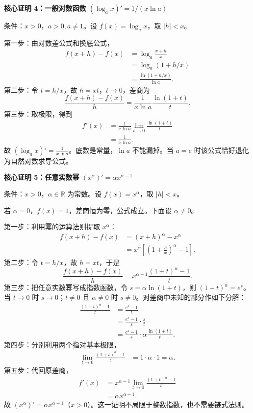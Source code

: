 \begin{proofbox}
\medskip
\begin{minipage}{\linewidth}
\textbf{\textcolor{CProof}{核心证明 4：一般对数函数 $(\log_a x)'=1/(x\ln a)$}}


\end{minipage}

条件：$x>0$，$a>0,a\ne1$。设 $f(x)=\log_a x$，取 $|h|<x$。

第一步：由对数差公式和换底公式，
\[
\begin{aligned}
f(x+h)-f(x)&=\log_a\frac{x+h}{x}\\
&=\log_a(1+h/x)\\
&=\frac{\ln(1+h/x)}{\ln a}.
\end{aligned}
\]
第二步：令 $t=h/x$，故 $h=xt$，$t\to0$，差商为
\[
\frac{f(x+h)-f(x)}h=\frac1{x\ln a}\frac{\ln(1+t)}t.
\]
第三步：取极限，得到
\[
\begin{aligned}
f'(x)&=\frac1{x\ln a}\lim_{t\to0}\frac{\ln(1+t)}t\\
&=\frac1{x\ln a}.
\end{aligned}
\]
故 $\boxed{(\log_a x)'=\frac1{x\ln a}}$。底数是常量，$\ln a$ 不能漏掉。当 $a=e$ 时该公式恰好退化为自然对数求导公式。

\medskip
\begin{minipage}{\linewidth}
\textbf{\textcolor{CProof}{核心证明 5：任意实数幂 $(x^\alpha)'=\alpha x^{\alpha-1}$}}


\end{minipage}

条件：$x>0$，$\alpha\in\mathbb R$ 为常数。设 $f(x)=x^\alpha$，取 $|h|<x$。

若 $\alpha=0$，$f(x)=1$，差商恒为零，公式成立。下面设 $\alpha\ne0$。

第一步：利用幂的运算法则提取 $x^\alpha$：
\[
\begin{aligned}
f(x+h)-f(x)&=(x+h)^\alpha-x^\alpha\\
&=x^\alpha\left[\left(1+\frac h x\right)^\alpha-1\right].
\end{aligned}
\]
第二步：令 $t=h/x$，故 $h=xt$，于是
\[
\frac{f(x+h)-f(x)}h=x^{\alpha-1}\frac{(1+t)^\alpha-1}{t}.
\]
第三步：把任意实数幂写成指数函数，令 $s=\alpha\ln(1+t)$，则 $(1+t)^\alpha=e^s$。当 $t\to0$ 时 $s\to0$；$t\ne0$ 且 $\alpha\ne0$ 时 $s\ne0$。对差商中未知的部分作如下分解：
\[
\begin{aligned}
\frac{(1+t)^\alpha-1}{t}
&=\frac{e^s-1}{t}\\
&=\frac{e^s-1}{s}\cdot\frac{s}{t}\\
&=\frac{e^s-1}{s}\cdot\alpha\frac{\ln(1+t)}{t}.
\end{aligned}
\]
第四步：分别利用两个指对基本极限，
\[
\begin{aligned}
\lim_{t\to0}\frac{(1+t)^\alpha-1}{t}
&=1\cdot\alpha\cdot1=\alpha.
\end{aligned}
\]
第五步：代回原差商，
\[
\begin{aligned}
f'(x)&=x^{\alpha-1}\lim_{t\to0}\frac{(1+t)^\alpha-1}{t}\\
&=\alpha x^{\alpha-1}.
\end{aligned}
\]
故 $\boxed{(x^\alpha)'=\alpha x^{\alpha-1}}$（$x>0$）。这一证明不局限于整数指数，也不需要链式法则。


\end{proofbox}
